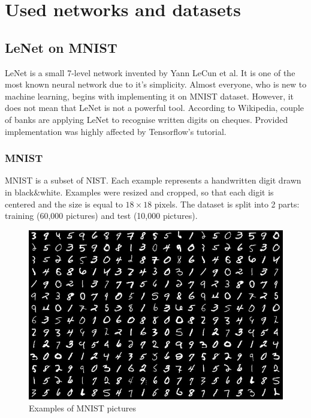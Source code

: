 \documentclass[licencjacka]{pracamgr}
\begin{document}
\chapter{Used networks and datasets}
		\section{LeNet on MNIST}
 		LeNet is a small 7-level network invented by Yann LeCun et al. It is one of the most known neural network due to it’s simplicity. Almost everyone, who is new to machine learning, begins with implementing it on MNIST dataset. However, it does not mean that LeNet is not a powerful tool. According to Wikipedia, couple of banks are applying LeNet to recognise written digits on cheques. Provided implementation was highly affected by Tensorflow's tutorial. \\
 		\subsection{MNIST}
 			MNIST is a subset of NIST. Each example represents a handwritten digit drawn in black\&white. Examples were resized and cropped, so that each digit is centered and the size is equal to $18\times18$ pixels. The dataset is split into 2 parts: training (60,000 pictures) and test (10,000 pictures).
 			\begin{figure}[h]
				\caption{Examples of MNIST pictures}
				\centering
				\includegraphics[width=\textwidth]{images/mnist}
			\end{figure}
\end{document}
